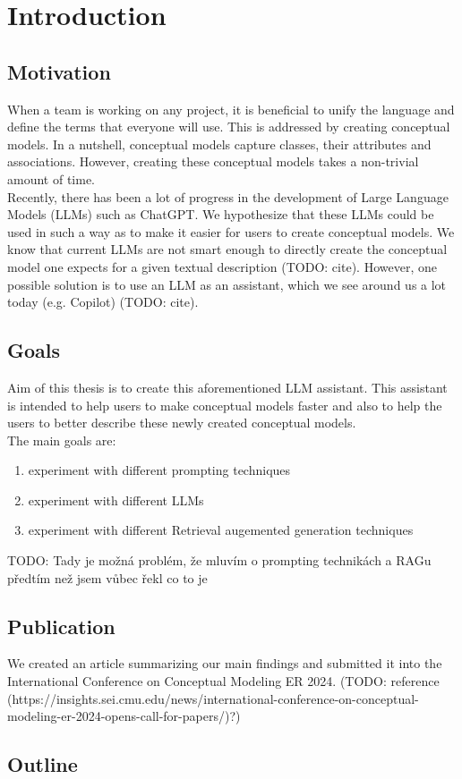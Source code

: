 \chapter*{Introduction}


\section*{Motivation}
When a team is working on any project, it is beneficial to unify the language and define the terms 
that everyone will use. This is addressed by creating conceptual models. In a nutshell, conceptual 
models capture classes, their attributes and associations. However, creating these conceptual 
models takes a non-trivial amount of time. \\

Recently, there has been a lot of progress in the development of Large Language Models (LLMs) such 
as ChatGPT. We hypothesize that these LLMs could be used in such a way as to make it easier for 
users to create conceptual models. We know that current LLMs are not smart enough to directly 
create the conceptual model one expects for a given textual description (TODO: cite). However, one possible solution is to use an LLM as an assistant, which we see around us a lot today (e.g. Copilot) (TODO: cite). \\



\section*{Goals}
Aim of this thesis is to create this aforementioned LLM assistant. This assistant is intended to help users to make conceptual models faster and also to help the users to better describe these newly created conceptual models. \\

The main goals are:
\begin{enumerate}
\item experiment with different prompting techniques
\item experiment with different LLMs
\item experiment with different Retrieval augemented generation techniques
\end{enumerate}

TODO: Tady je možná problém, že mluvím o prompting technikách a RAGu předtím než jsem vůbec řekl co to je


\section*{Publication}
We created an article summarizing our main findings and submitted it into the International Conference on Conceptual Modeling ER 2024. (TODO: reference (https://insights.sei.cmu.edu/news/international-conference-on-conceptual-modeling-er-2024-opens-call-for-papers/)?)

\section*{Outline}
